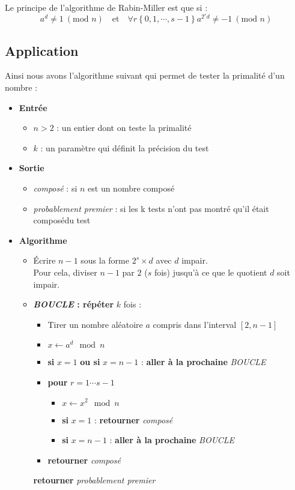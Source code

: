 Le principe de l'algorithme de Rabin-Miller est que si :
\[ a^d \neq 1\ (\text{mod } n) \quad\text{et}\quad \forall r\left\{0,1,\cdots,s-1\right\} a^{2^r d} \neq -1\ (\text{mod } n) \]


\subsection{Application}
Ainsi nous avons l'algorithme suivant qui permet de tester la primalité d'un nombre : 

\setlength\itemindent{2cm} 
\begin{itemize}
	\item[] \textbf{Entrée}
		\begin{itemize}
			\item[] $n>2$ : un entier dont on teste la primalité
			\item[] $k$ : un paramètre qui définit la précision du test 
		\end{itemize}
	\item[] \textbf{Sortie}
		\begin{itemize}
			\item[] \textit{composé} : si $n$ est un nombre composé
			\item[] \textit{probablement premier} :  si les k tests n'ont pas montré qu'il était composédu test 
		\end{itemize}
	\item[] \textbf{Algorithme}
		\begin{itemize}
			\item[] Écrire  $n-1$ sous la forme $2^s\times d$ avec $d$ impair.\\
			Pour cela, diviser $n-1$ par $2$ ($s$ fois) jusqu'à ce que le quotient $d$ soit impair.
			\item[] \textbf{\textit{BOUCLE} : répéter} $k$ fois :
			\begin{itemize}
				\item[] Tirer un nombre aléatoire $a$ compris dans l'interval $[2,n-1]$
				\item[] $x \leftarrow a^d \mod n$
				\item[] \textbf{si} $x=1$ \textbf{ou si} $x=n-1$ : \textbf{aller à la prochaine} \textit{BOUCLE}
				\item[] \textbf{pour} $r=1\cdots s-1$
				\begin{itemize}
					\item[] $x \leftarrow x^2 \mod n$
					\item[] \textbf{si} $x = 1$ : \textbf{retourner} \textit{composé}
					\item[] \textbf{si} $x=n-1$ : \textbf{aller à la prochaine} \textit{BOUCLE}
				\end{itemize}
				\item[] \textbf{retourner} \textit{composé}
			\end{itemize}
			\textbf{retourner} \textit{probablement premier}
		\end{itemize}
\end{itemize}

